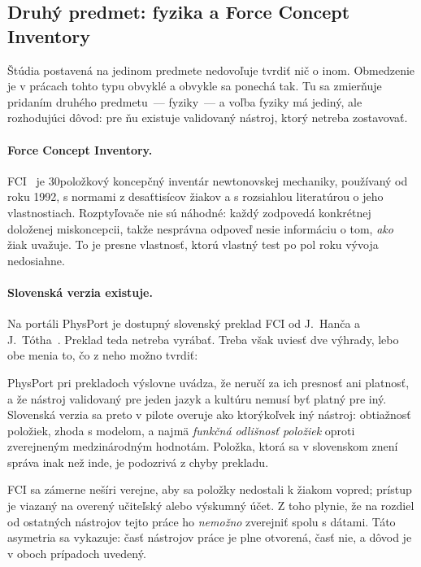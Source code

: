 \subsection{Druhý predmet: fyzika a Force Concept Inventory}
\label{sec:fyzika}

Štúdia postavená na jedinom predmete nedovoľuje tvrdiť nič o inom. Obmedzenie je v prácach tohto typu obvyklé a obvykle sa ponechá tak. Tu sa zmierňuje pridaním druhého predmetu~--- fyziky~--- a voľba fyziky má jediný, ale rozhodujúci dôvod: pre ňu existuje validovaný nástroj, ktorý netreba zostavovať.

\paragraph{Force Concept Inventory.} FCI~\cite{hestenes1992fci} je 30\-položkový koncepčný inventár newtonovskej mechaniky, používaný od roku 1992, s normami z desaťtisícov žiakov a s rozsiahlou literatúrou o jeho vlastnostiach. Rozptyľovače nie sú náhodné: každý zodpovedá konkrétnej doloženej miskoncepcii, takže nesprávna odpoveď nesie informáciu o tom, \emph{ako} žiak uvažuje. To je presne vlastnosť, ktorú vlastný test po pol roku vývoja nedosiahne.

\paragraph{Slovenská verzia existuje.} Na portáli PhysPort je dostupný slovenský preklad FCI od J.~Hanča a J.~Tótha~\cite{physport2025fci}. Preklad teda netreba vyrábať. Treba však uviesť dve výhrady, lebo obe menia to, čo z neho možno tvrdiť:

\begin{description}[leftmargin=0.6cm, nosep]
    \item[\textbf{Preklad nie je validácia.}] PhysPort pri prekladoch výslovne uvádza, že neručí za ich presnosť ani platnosť, a že nástroj validovaný pre jeden jazyk a kultúru nemusí byť platný pre iný. Slovenská verzia sa preto v pilote overuje ako ktorýkoľvek iný nástroj: obtiažnosť položiek, zhoda s modelom, a najmä \emph{funkčná odlišnosť položiek} oproti zverejneným medzinárodným hodnotám. Položka, ktorá sa v slovenskom znení správa inak než inde, je podozrivá z chyby prekladu.
    \item[\textbf{Nástroj je chránený.}] FCI sa zámerne nešíri verejne, aby sa položky nedostali k žiakom vopred; prístup je viazaný na overený učiteľský alebo výskumný účet. Z toho plynie, že na rozdiel od ostatných nástrojov tejto práce ho \emph{nemožno} zverejniť spolu s dátami. Táto asymetria sa vykazuje: časť nástrojov práce je plne otvorená, časť nie, a dôvod je v oboch prípadoch uvedený.
\end{description}

